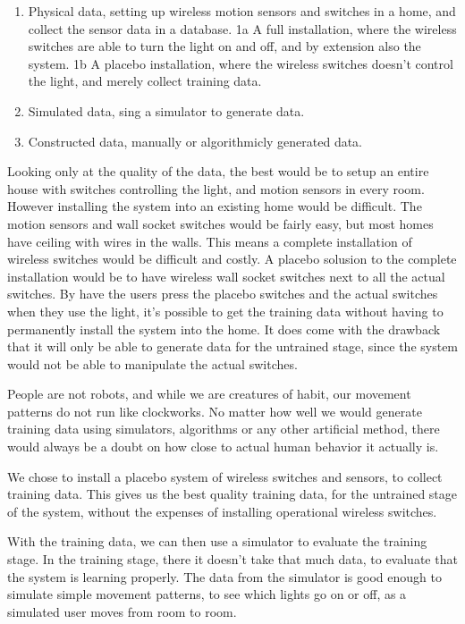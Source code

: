 \begin{enumerate}
\item Physical data, setting up wireless motion sensors and switches in a home, and collect the sensor data in a database.
1a A full installation, where the wireless switches are able to turn the light on and off, and by extension also the system.
1b A placebo installation, where the wireless switches doesn't control the light, and merely collect training data.

\item Simulated data, sing a simulator to generate data.

\item Constructed data, manually or algorithmicly generated data.

\end{enumerate}

Looking only at the quality of the data, the best would be to setup an entire house with switches controlling the light, and motion sensors in every room. However installing the system into an existing home would be difficult. The motion sensors and wall socket switches would be fairly easy, but most homes have ceiling with wires in the walls. This means a complete installation of wireless switches would be difficult and costly.
A placebo solusion to the complete installation would be to have wireless wall socket switches next to all the actual switches. By have the users press the placebo switches and the actual switches when they use the light, it's possible to get the training data without having to permanently install the system into the home. It does come with the drawback that it will only be able to generate data for the untrained stage, since the system would not be able to manipulate the actual switches.

People are not robots, and while we are creatures of habit, our movement patterns do not run like clockworks. No matter how well we would generate training data using simulators, algorithms or any other artificial method, there would always be a doubt on how close to actual human behavior it actually is.

We chose to install a placebo system of wireless switches and sensors, to collect training data. This gives us the best quality training data, for the untrained stage of the system, without the expenses of installing operational wireless switches. 

With the training data, we can then use a simulator to evaluate the training stage. In the training stage, there it doesn't take that much data, to evaluate that the system is learning properly. The data from the simulator is good enough to simulate simple movement patterns, to see which lights go on or off, as a simulated user moves from room to room. 


